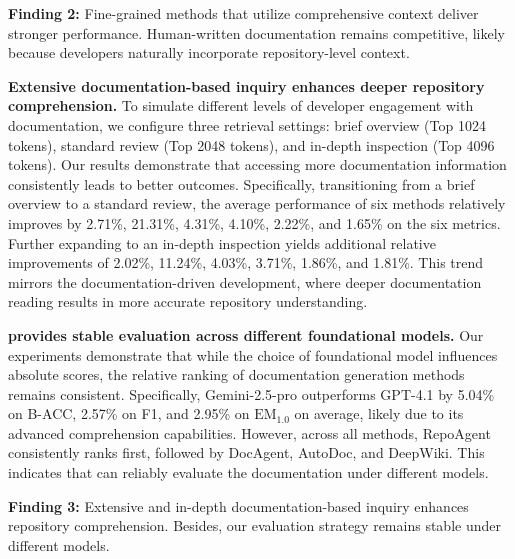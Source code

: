 \begin{myfindbox}
    \textbf{Finding 2:} Fine-grained methods that utilize comprehensive context deliver stronger performance. Human-written documentation remains competitive, likely because developers naturally incorporate repository-level context.
\end{myfindbox}

\textbf{Extensive documentation-based inquiry enhances deeper repository comprehension.}
To simulate different levels of developer engagement with documentation, we configure three retrieval settings: brief overview (Top 1024 tokens), standard review (Top 2048 tokens), and in-depth inspection (Top 4096 tokens). Our results demonstrate that accessing more documentation information consistently leads to better outcomes. Specifically, transitioning from a brief overview to a standard review, the average performance of six methods relatively improves by 2.71\%, 21.31\%, 4.31\%, 4.10\%, 2.22\%, and 1.65\% on the six metrics. Further expanding to an in-depth inspection yields additional relative improvements of 2.02\%, 11.24\%, 4.03\%, 3.71\%, 1.86\%, and 1.81\%. This trend mirrors the documentation-driven development, where deeper documentation reading results in more accurate repository understanding.

\textbf{\benchmark provides stable evaluation across different foundational models.} Our experiments demonstrate that while the choice of foundational model influences absolute scores, the relative ranking of documentation generation methods remains consistent. Specifically, Gemini-2.5-pro outperforms GPT-4.1 by 5.04\% on B-ACC, 2.57\% on F1, and 2.95\% on $\text{EM}_{1.0}$ on average, likely due to its advanced comprehension capabilities. However, across all methods, RepoAgent consistently ranks first, followed by DocAgent, AutoDoc, and DeepWiki. This indicates that \benchmark can reliably evaluate the documentation under different models. 

\begin{myfindbox}
    \textbf{Finding 3:} Extensive and in-depth documentation-based inquiry enhances repository comprehension. Besides, our evaluation strategy remains stable under different models.
\end{myfindbox}

